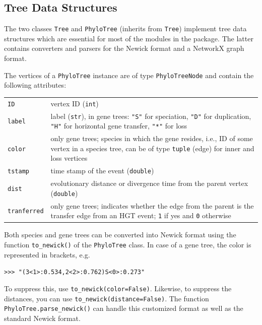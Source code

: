 \documentclass[hidelinks,11pt]{scrreprt}
\newcommand{\COMMANDLINE}[1]{\begingroup\par\vspace{3mm}\color{darkgrey}\begin{adjustwidth}{1cm}{1cm}\texttt{#1}\end{adjustwidth}\vspace{3mm}\endgroup}
\begin{document}
\subsection{Tree Data Structures}

The two classes \texttt{Tree} and \texttt{PhyloTree} (inherits from \texttt{Tree}) implement tree data structures which are essential for most of the modules in the package.
The latter contains converters and parsers for the Newick format and a NetworkX graph format.

The vertices of a \texttt{PhyloTree} instance are of type \texttt{PhyloTreeNode} and contain the following attributes:

\vspace{3mm}
\renewcommand{\arraystretch}{1.5}
\begin{tabularx}{0.95\textwidth} { >{\raggedright\arraybackslash}p{3cm} >{\raggedright\arraybackslash}X }
	\texttt{ID} & vertex ID (\texttt{int})\\
	\texttt{label}  & label (\texttt{str}), in gene trees: \texttt{"S"} for speciation, \texttt{"D"} for duplication, \texttt{"H"} for horizontal gene transfer, \texttt{"*"} for loss\\
	\texttt{color} & only gene trees; species in which the gene resides, i.e., ID of some vertex in a species tree, can be of type \texttt{tuple} (edge) for inner and loss vertices\\
	\texttt{tstamp} & time stamp of the event (\texttt{double})\\
	\texttt{dist} & evolutionary distance or divergence time from the parent vertex (\texttt{double})\\
	\texttt{tranferred} & only gene trees; indicates whether the edge from the parent is the transfer edge from an HGT event; \texttt{1} if yes and \texttt{0} otherwise \\
\end{tabularx}
\vspace{3mm}

Both species and gene trees can be converted into Newick format using the function \texttt{to\_newick()} of the \texttt{PhyloTree} class.
In case of a gene tree, the color is represented in brackets, e.g.
\COMMANDLINE{>>> "(3<1>:0.534,2<2>:0.762)S<0>:0.273"}
To suppress this, use \texttt{to\_newick(color=False)}. Likewise, to suppress the distances, you can use \texttt{to\_newick(distance=False)}.
The function \texttt{PhyloTree.parse\_newick()} can handle this customized format as well as the standard Newick format.
\end{document}
